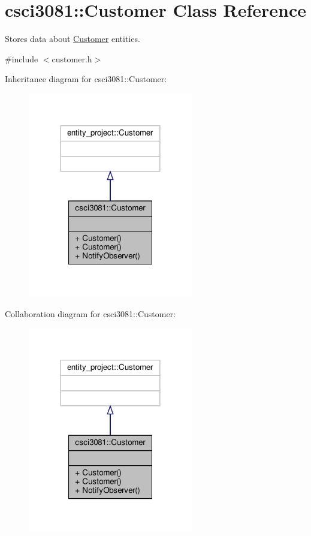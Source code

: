 \hypertarget{classcsci3081_1_1Customer}{}\section{csci3081\+:\+:Customer Class Reference}
\label{classcsci3081_1_1Customer}


Stores data about \hyperlink{classcsci3081_1_1Customer}{Customer} entities.  




{\ttfamily \#include $<$customer.\+h$>$}



Inheritance diagram for csci3081\+:\+:Customer\+:\nopagebreak
\begin{figure}[H]
\begin{center}
\leavevmode
\includegraphics[width=204pt]{classcsci3081_1_1Customer__inherit__graph}
\end{center}
\end{figure}


Collaboration diagram for csci3081\+:\+:Customer\+:\nopagebreak
\begin{figure}[H]
\begin{center}
\leavevmode
\includegraphics[width=204pt]{classcsci3081_1_1Customer__coll__graph}
\end{center}
\end{figure}
